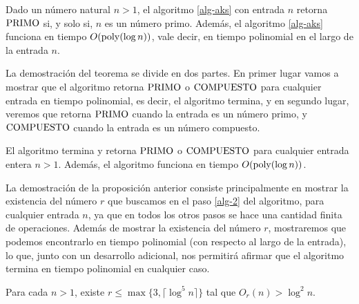 	\begin{theorem} \label{teo-4.1}
		Dado un número natural $n > 1$, el algoritmo \ref{alg-aks} con entrada $n$ retorna $\text{\rm PRIMO}$ 
		si, y solo si, $n$ es un número primo. Además, el algoritmo \ref{alg-aks} funciona en tiempo $O({\rm poly}(\log n))$, vale decir, en tiempo polinomial en el largo de la entrada $n$. 
	\end{theorem}
	La demostración del teorema se divide en dos partes. En primer lugar vamos a mostrar que el algoritmo retorna $\text{\rm PRIMO}$ o $\text{\rm COMPUESTO}$ para cualquier entrada en tiempo polinomial, es decir, el algoritmo termina, y en segundo lugar, veremos que retorna $\text{\rm PRIMO}$ cuando la entrada es un número primo, y $\text{\rm COMPUESTO}$ cuando la entrada es un número compuesto. 
	\begin{proposition}\label{prop-lem-1}
		El algoritmo termina y retorna $\text{\rm PRIMO}$ o $\text{\rm COMPUESTO}$ para cualquier entrada entera $n>1$. Además, el algoritmo funciona en tiempo $O({\rm poly}(\log n))$.
	\end{proposition}
	La demostración de la proposición anterior consiste principalmente en mostrar la existencia del número $r$ que buscamos en el paso \ref{alg-2} del algoritmo, para cualquier entrada $n$, ya que en todos los otros pasos se hace una cantidad finita de operaciones. Además de mostrar la existencia del número $r$, mostraremos que podemos encontrarlo en tiempo polinomial (con respecto al largo de la entrada), lo que, junto con un desarrollo adicional, nos permitirá afirmar que el algoritmo termina en tiempo polinomial en cualquier caso. 
	\begin{lemma}\label{prop-1}
		Para cada $n > 1$, existe $r \leq \max\{3,\lceil \log ^5 n\rceil\}$ tal que $O_r(n)>\log ^2 n$.
	\end{lemma}
